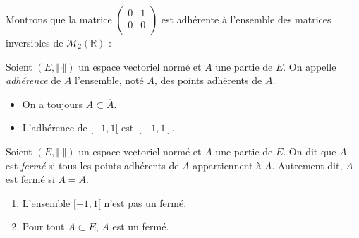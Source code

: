 \documentclass[french,11pt,twoside]{VcCours}
\begin{document}


\begin{Exemple} Montrons que la matrice $\begin{pmatrix}
0 & 1 \\
0 & 0 \\
\end{pmatrix}$ est adhérente à l'ensemble des matrices inversibles de $\mathcal{M}_2(\mathbb{R})$ :

\vspace{3cm}
%
\end{Exemple}

\begin{Definition}{} Soient $(E, \Vert \cdot \Vert)$ un espace vectoriel normé et $A$ une partie de $E$. On appelle \emph{adhérence} de $A$ l'ensemble, noté $\overline{A}$, des points adhérents de $A$.
\end{Definition}

\begin{Remarques}{}
\begin{itemize}
\item On a toujours $A \subset \overline{A}$.
\item L'adhérence de $[-1,1[$ est $[-1,1]$.
\end{itemize}
\end{Remarques}{}

\begin{Definition}{} Soient $(E, \Vert \cdot \Vert)$ un espace vectoriel normé et $A$ une partie de $E$. On dit que $A$ est \emph{fermé} si tous les points adhérents de $A$ appartiennent à $A$. Autrement dit, $A$ est fermé si $\overline{A}=A$.
\end{Definition}

\begin{Exemples}
\begin{enumerate}
\item L'ensemble $[-1,1[$ n'est pas un fermé.
\item Pour tout $A \subset E$, $\overline{A}$ est un fermé.
\end{enumerate}
\end{Exemples}
\end{document}
